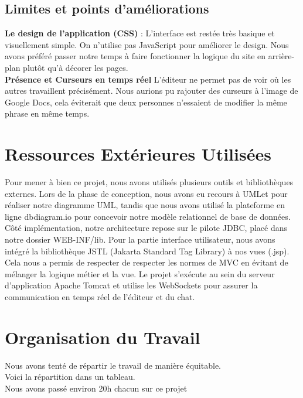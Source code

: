 \documentclass[14pt,a4paper]{extarticle}
\begin{document}
\subsection{Limites et points d'améliorations}
\textbf{Le design de l'application (CSS)} : L'interface est restée très basique et visuellement simple. On n'utilise pas JavaScript pour améliorer le design. Nous avons préféré passer notre temps à faire fonctionner la logique du site en arrière-plan plutôt qu'à décorer les pages. \\
\textbf{Présence et Curseurs en temps réel}
L'éditeur ne permet pas de voir où les autres travaillent précisément. Nous aurions pu rajouter des curseurs à l'image de Google Docs, cela éviterait que deux personnes n'essaient de modifier la même phrase en même temps.

\section{Ressources Extérieures Utilisées}
\label{sec:ressources}

Pour mener à bien ce projet, nous avons utilisés  plusieurs outils et bibliothèques externes. Lors de la phase de conception, nous avons eu recours à UMLet pour réaliser notre diagramme UML, tandis que nous avons utilisé la plateforme en ligne dbdiagram.io pour concevoir notre modèle relationnel de base de données. Côté implémentation, notre architecture repose sur le pilote JDBC, placé dans notre dossier WEB-INF/lib. Pour la partie interface utilisateur, nous avons intégré la bibliothèque JSTL (Jakarta Standard Tag Library) à nos vues (.jsp). Cela nous a permis de respecter de respecter les normes de MVC en évitant de mélanger la logique métier et la vue. Le projet s'exécute au sein du serveur d'application Apache Tomcat et utilise les WebSockets  pour assurer la communication en temps réel de l'éditeur et du chat.
\section{Organisation du Travail}
\label{sec:organisation}

Nous avons tenté de répartir le travail de manière équitable. \\
Voici la répartition dans un tableau. \\
Nous avons passé environ 20h chacun sur ce projet \\
\end{document}
